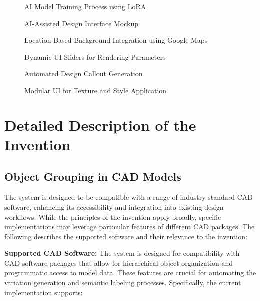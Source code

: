 \documentclass{article}
\begin{document}
\begin{figure}[H]
    \centering
    \caption{AI Model Training Process using LoRA}
    \label{fig:ai_model_training_lora}
\end{figure}

\begin{figure}[H]
    \centering
    \caption{AI-Assisted Design Interface Mockup}
    \label{fig:design_interface_mockup}
\end{figure}

\begin{figure}[H]
    \centering
    \caption{Location-Based Background Integration using Google Maps}
    \label{fig:location_based_background}
\end{figure}

\begin{figure}[H]
    \centering
    \caption{Dynamic UI Sliders for Rendering Parameters}
    \label{fig:dynamic_ui_sliders}
\end{figure}

\begin{figure}[H]
    \centering
    \caption{Automated Design Callout Generation}
    \label{fig:automated_design_callout}
\end{figure}

\begin{figure}[H]
    \centering
    \caption{Modular UI for Texture and Style Application}
    \label{fig:modular_ui_texture_style}
\end{figure}


\section{Detailed Description of the Invention}

\subsection{Object Grouping in CAD Models}

The system is designed to be compatible with a range of industry-standard CAD software, enhancing its accessibility and integration into existing design workflows. While the principles of the invention apply broadly, specific implementations may leverage particular features of different CAD packages. The following describes the supported software and their relevance to the invention:

\textbf{Supported CAD Software:} The system is designed for compatibility with CAD software packages that allow for hierarchical object organization and programmatic access to model data. These features are crucial for automating the variation generation and semantic labeling processes. Specifically, the current implementation supports:
\end{document}
